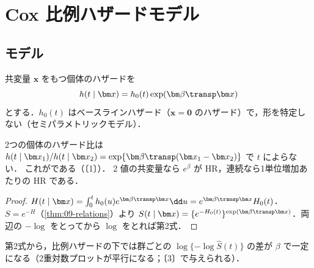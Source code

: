 
\section{Cox 比例ハザードモデル}\label{sec:10-cox}
\Hissu\Hinshutsu
\subsection{モデル}
\begin{teigi}\label{def:10-cox}
共変量 $\bm x$ をもつ個体のハザードを
\begin{equation}
h(t\mid\bm x)=h_0(t)\exp(\bm\beta\transp\bm x)\label{eq:10-cox}
\end{equation}
とする．$h_0(t)$ はベースラインハザード（$\bm x=\bm0$ のハザード）で，形を特定しない（セミパラメトリックモデル）．
\end{teigi}
2つの個体のハザード比は $h(t\mid\bm x_1)/h(t\mid\bm x_2)=\exp\{\bm\beta\transp(\bm x_1-\bm x_2)\}$ で $t$ によらない．
これがである（〔1〕）．
2 値の共変量なら $e^{\beta}$ が HR，連続なら1単位増加あたりの HR である．

\begin{proof}
$H(t\mid\bm x)=\int_0^th_0(u)e^{\bm\beta\transp\bm x}\dd u=e^{\bm\beta\transp\bm x}H_0(t)$．
$S=e^{-H}$（\cref{thm:09-relations}）より $S(t\mid\bm x)=\{e^{-H_0(t)}\}^{\exp(\bm\beta\transp\bm x)}$．両辺の $-\log$ をとってから $\log$ をとれば第2式．
\end{proof}
第2式から，比例ハザードの下では群ごとの $\log\{-\log\hat S(t)\}$ の差が $\beta$ で一定になる（2重対数プロットが平行になる；〔3〕で与えられる）．

